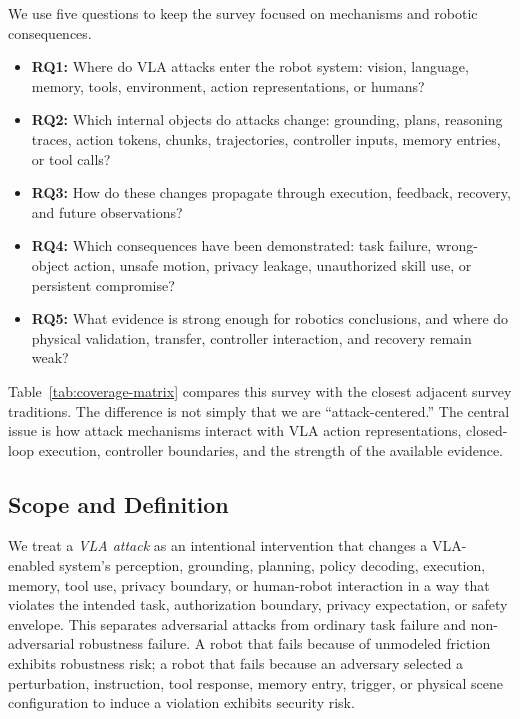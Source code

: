 We use five questions to keep the survey focused on mechanisms and robotic consequences.
\begin{itemize}
    \item \textbf{RQ1:} Where do VLA attacks enter the robot system: vision, language, memory, tools, environment, action representations, or humans?
    \item \textbf{RQ2:} Which internal objects do attacks change: grounding, plans, reasoning traces, action tokens, chunks, trajectories, controller inputs, memory entries, or tool calls?
    \item \textbf{RQ3:} How do these changes propagate through execution, feedback, recovery, and future observations?
    \item \textbf{RQ4:} Which consequences have been demonstrated: task failure, wrong-object action, unsafe motion, privacy leakage, unauthorized skill use, or persistent compromise?
    \item \textbf{RQ5:} What evidence is strong enough for robotics conclusions, and where do physical validation, transfer, controller interaction, and recovery remain weak?
\end{itemize}

Table~\ref{tab:coverage-matrix} compares this survey with the closest adjacent survey traditions. The difference is not simply that we are ``attack-centered.'' The central issue is how attack mechanisms interact with VLA action representations, closed-loop execution, controller boundaries, and the strength of the available evidence.



\subsection{Scope and Definition}

We treat a \emph{VLA attack} as an intentional intervention that changes a VLA-enabled system's perception, grounding, planning, policy decoding, execution, memory, tool use, privacy boundary, or human-robot interaction in a way that violates the intended task, authorization boundary, privacy expectation, or safety envelope. This separates adversarial attacks from ordinary task failure and non-adversarial robustness failure. A robot that fails because of unmodeled friction exhibits robustness risk; a robot that fails because an adversary selected a perturbation, instruction, tool response, memory entry, trigger, or physical scene configuration to induce a violation exhibits security risk.

